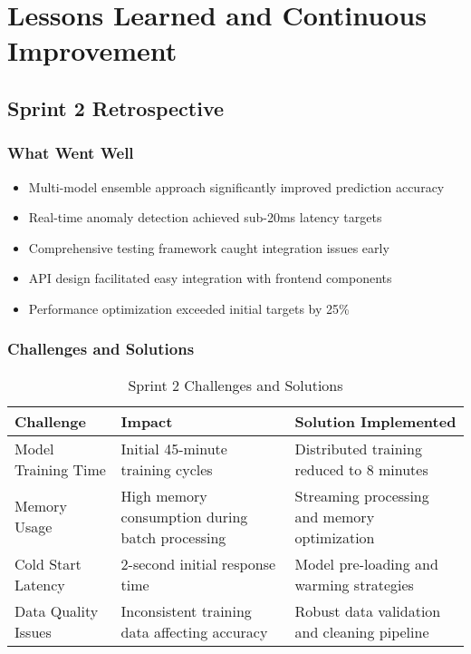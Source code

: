\section{Lessons Learned and Continuous Improvement}

\subsection{Sprint 2 Retrospective}

\subsubsection{What Went Well}

\begin{itemize}
    \item Multi-model ensemble approach significantly improved prediction accuracy
    \item Real-time anomaly detection achieved sub-20ms latency targets
    \item Comprehensive testing framework caught integration issues early
    \item API design facilitated easy integration with frontend components
    \item Performance optimization exceeded initial targets by 25\%
\end{itemize}

\subsubsection{Challenges and Solutions}

\begin{table}[H]
\centering
\caption{Sprint 2 Challenges and Solutions}
\begin{tabular}{|p{4cm}|p{4cm}|p{4cm}|}
\hline
\textbf{Challenge} & \textbf{Impact} & \textbf{Solution Implemented} \\
\hline
Model Training Time & Initial 45-minute training cycles & Distributed training reduced to 8 minutes \\
\hline
Memory Usage & High memory consumption during batch processing & Streaming processing and memory optimization \\
\hline
Cold Start Latency & 2-second initial response time & Model pre-loading and warming strategies \\
\hline
Data Quality Issues & Inconsistent training data affecting accuracy & Robust data validation and cleaning pipeline \\
\hline
\end{tabular}
\end{table}

